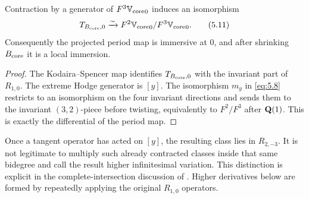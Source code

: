 \begin{theorem}
\label{thm:local-maximality}
Contraction by a generator of \(F^3{\mathbb V_{\mathrm{core}}}_0\) induces an isomorphism
\[
 T_{B_{\mathrm{core}},0}\xrightarrow{\sim}
 F^2{\mathbb V_{\mathrm{core}}}_0/F^3{\mathbb V_{\mathrm{core}}}_0.                     \tag{5.11}
\]
Consequently the projected period map is immersive at \(0\), and after
shrinking \(B_{\mathrm{core}}\) it is a local immersion.
\end{theorem}

\begin{proof}
The Kodaira--Spencer map identifies \(T_{B_{\mathrm{core}},0}\) with the invariant
part of \(R_{1,0}\).  The extreme Hodge generator is \([y]\).  The
isomorphism \(m_y\) in \cref{eq:5.8} restricts to an isomorphism on the four
invariant directions and sends them to the invariant
\((3,2)\)-piece before twisting, equivalently to
\(F^2/F^3\) after \(\mathbf Q(1)\).  This is exactly the differential of the
period map.
\end{proof}

\begin{remark}
Once a tangent operator has acted on \([y]\), the resulting class lies in
\(R_{2,-3}\).  It is not legitimate to multiply such already contracted
classes inside that same bidegree and call the result higher
infinitesimal variation.  This distinction is explicit in the
complete-intersection discussion of
\cite[\S5.6]{FaveroIlievKatzarkov2014}.  Higher derivatives below are
formed by repeatedly applying the original \(R_{1,0}\) operators.
\end{remark}
